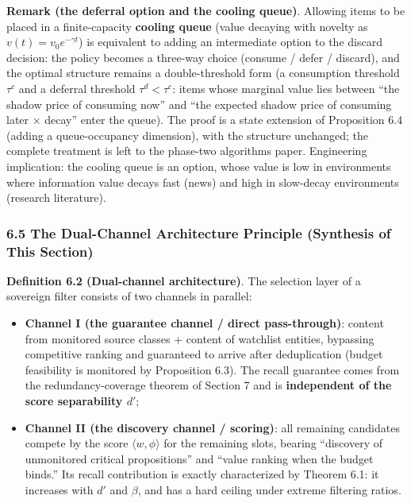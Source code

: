 \documentclass[
  11pt]{article}
\providecommand{\tightlist}{%
  \setlength{\itemsep}{0pt}\setlength{\parskip}{0pt}}
\begin{document}
\textbf{Remark (the deferral option and the cooling queue)}. Allowing
items to be placed in a finite-capacity \textbf{cooling queue} (value
decaying with novelty as \(v(t) = v_0 e^{-\gamma t}\)) is equivalent to
adding an intermediate option to the discard decision: the policy
becomes a three-way choice (consume / defer / discard), and the optimal
structure remains a double-threshold form (a consumption threshold
\(\tau^{c}\) and a deferral threshold \(\tau^{d} < \tau^{c}\): items
whose marginal value lies between ``the shadow price of consuming now''
and ``the expected shadow price of consuming later × decay'' enter the
queue). The proof is a state extension of Proposition 6.4 (adding a
queue-occupancy dimension), with the structure unchanged; the complete
treatment is left to the phase-two algorithms paper. Engineering
implication: the cooling queue is an option, whose value is low in
environments where information value decays fast (news) and high in
slow-decay environments (research literature).

\subsubsection{6.5 The Dual-Channel Architecture Principle (Synthesis of
This
Section)}\label{the-dual-channel-architecture-principle-synthesis-of-this-section}

\textbf{Definition 6.2 (Dual-channel architecture)}. The selection layer
of a sovereign filter consists of two channels in parallel:

\begin{itemize}
\tightlist
\item
  \textbf{Channel I (the guarantee channel / direct pass-through)}:
  content from monitored source classes + content of watchlist entities,
  bypassing competitive ranking and guaranteed to arrive after
  deduplication (budget feasibility is monitored by Proposition 6.3).
  The recall guarantee comes from the redundancy-coverage theorem of
  Section 7 and is \textbf{independent of the score separability
  \(d'\)};
\item
  \textbf{Channel II (the discovery channel / scoring)}: all remaining
  candidates compete by the score \(\langle w, \phi \rangle\) for the
  remaining slots, bearing ``discovery of unmonitored critical
  propositions'' and ``value ranking when the budget binds.'' Its recall
  contribution is exactly characterized by Theorem 6.1: it increases
  with \(d'\) and \(\beta\), and has a hard ceiling under extreme
  filtering ratios.
\end{itemize}
\end{document}
